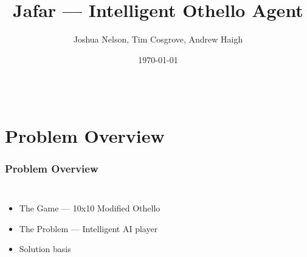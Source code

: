 \documentclass[10pt]{beamer}
\title{Jafar --- Intelligent Othello Agent}    %
\author{Joshua Nelson, Tim Cosgrove, Andrew Haigh}                 %
\institute{COMP3130 Research Project}      %
\date{\today}                    %
\begin{document}
\begin{frame}
  \titlepage
\end{frame}
\note{} %

\section[Outline]{}

\begin{frame}
  
  \begin{columns}[c]
  \column{2in}
  \tableofcontents
  \column{2in}
  \end{columns}
\end{frame}


\section{Problem Overview}

\begin{frame}
  \frametitle{Problem Overview}   %
  \begin{columns}[c]
  \column{2in}  %
  \begin{itemize}
  \item<1-> The Game --- 10x10 Modified Othello
  \item<2-> The Problem --- Intelligent AI player
  \item<3-> Solution basis
  \end{itemize}
  \column{2in}
  \end{columns}
\end{frame}
\end{document}
